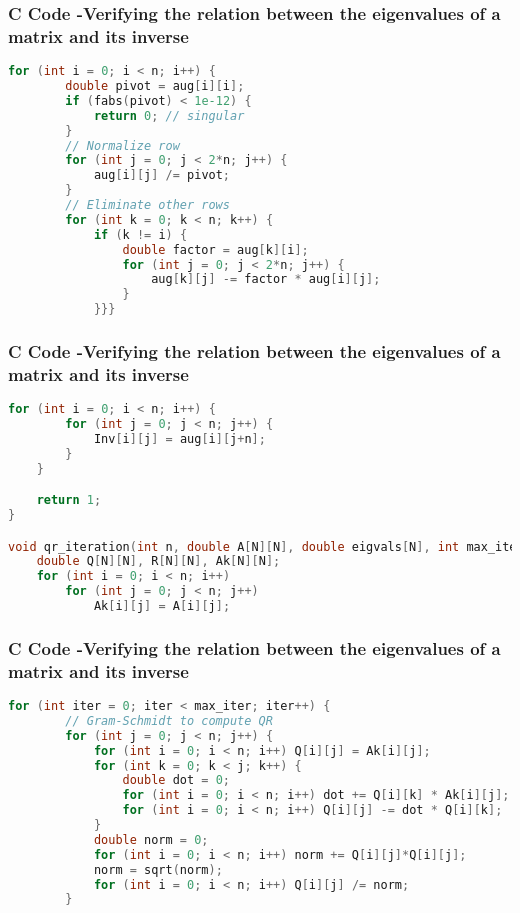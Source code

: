 \documentclass{beamer}
\begin{document}
\begin{frame}[fragile]
    \frametitle{C Code -Verifying the relation between the eigenvalues of a matrix and its inverse}

    \begin{lstlisting}[language=C]
    for (int i = 0; i < n; i++) {
        double pivot = aug[i][i];
        if (fabs(pivot) < 1e-12) {
            return 0; // singular
        }
        // Normalize row
        for (int j = 0; j < 2*n; j++) {
            aug[i][j] /= pivot;
        }
        // Eliminate other rows
        for (int k = 0; k < n; k++) {
            if (k != i) {
                double factor = aug[k][i];
                for (int j = 0; j < 2*n; j++) {
                    aug[k][j] -= factor * aug[i][j];
                }
            }}}
    \end{lstlisting}
\end{frame}

\begin{frame}[fragile]
    \frametitle{C Code -Verifying the relation between the eigenvalues of a matrix and its inverse}

    \begin{lstlisting}[language=C]
   for (int i = 0; i < n; i++) {
        for (int j = 0; j < n; j++) {
            Inv[i][j] = aug[i][j+n];
        }
    }

    return 1; 
}

void qr_iteration(int n, double A[N][N], double eigvals[N], int max_iter, double tol) {
    double Q[N][N], R[N][N], Ak[N][N];
    for (int i = 0; i < n; i++)
        for (int j = 0; j < n; j++)
            Ak[i][j] = A[i][j];

    \end{lstlisting}
\end{frame}

\begin{frame}[fragile]
    \frametitle{C Code -Verifying the relation between the eigenvalues of a matrix and its inverse}

    \begin{lstlisting}[language=C]
 for (int iter = 0; iter < max_iter; iter++) {
        // Gram-Schmidt to compute QR
        for (int j = 0; j < n; j++) {
            for (int i = 0; i < n; i++) Q[i][j] = Ak[i][j];
            for (int k = 0; k < j; k++) {
                double dot = 0;
                for (int i = 0; i < n; i++) dot += Q[i][k] * Ak[i][j];
                for (int i = 0; i < n; i++) Q[i][j] -= dot * Q[i][k];
            }
            double norm = 0;
            for (int i = 0; i < n; i++) norm += Q[i][j]*Q[i][j];
            norm = sqrt(norm);
            for (int i = 0; i < n; i++) Q[i][j] /= norm;
        }
    \end{lstlisting}
\end{frame}
\end{document}
